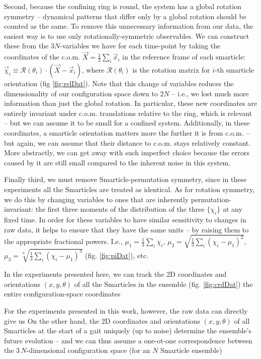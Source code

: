 \documentclass[reprint,prx]{revtex4-1}
\renewcommand{\=}[1]{\stackrel{#1}{=}} %
\renewcommand{\(}{\left (}
\renewcommand{\)}{\right  )}
\renewcommand{\[}{\left [}
\renewcommand{\]}{\right ]}
\newcommand{\<}{\left <}
\renewcommand{\>}{\right >}
\theoremstyle{definition}
\theoremstyle{remark}
\begin{document}
Second, because the confining ring is round, the system has a global rotation symmetry -- dynamical patterns that differ only by a global rotation should be counted as the same. To remove this unnecessary information from our data, the easiest way is to use only rotationally-symmetric observables. We can construct these from the $ 3N $-variables we have for each time-point by taking the coordinates of the c.o.m. $ \vec{X}= \frac{1}{3} \sum_i \vec{x}_i $ in the reference frame of each smarticle: $ \vec{\chi}_i \equiv \mathcal{R}(\theta_i) \cdot (\vec{X} - \vec{x}_i) $, where $ \mathcal{R}(\theta_i) $ is the rotation matrix for $ i $-th smarticle orientation (fig \ref{fig:relDat}). Note that this change of variables reduces the dimensionality of our configuration space down to $ 2N $ -- i.e., we lost much more information than just the global rotation. In particular, these new coordinates are entirely invariant under c.o.m. translations relative to the ring, which is relevant -- but we can assume it to be small for a confined system. Additionally, in these coordinates, a smarticle orientation matters more the further it is from c.o.m. -- but again, we can assume that their distance to c.o.m. stays relatively constant. More abstractly, we can get away with such imperfect choice because the errors caused by it are still small compared to the inherent noise in this system. 

Finally third, we must remove Smarticle-permutation symmetry, since in these experiments all the Smarticles are treated as identical. As for rotation symmetry, we do this by changing variables to ones that are inherently permutation-invariant: the first three moments of the distribution of the three $ \{\chi_i\} $ at any fixed time. In order for these variables to have similar sensitivity to changes in raw data, it helps to ensure that they have the same units -- by raising them to the appropriate fractional powers. I.e., $ \mu_1 = \frac{1}{3} \sum_i \chi_i $, $ \mu_2 = \sqrt{\frac{1}{3} \sum_i (\chi_i-\mu_1)^2} $, $ \mu_3 = \sqrt[3]{\frac{1}{3} \sum_i (\chi_i-\mu_1)^3} $ (fig. \ref{fig:piDat}), etc.

In the experiments presented here, we can track the 2D coordinates and orientations $ (x,y,\theta) $ of all the Smarticles in the ensemble (fig. \ref{fig:crdDat}) the entire configuration-space coordinates 

For the experiments presented in this work, however, the raw data can directly give us On the other hand, the 2D coordinates and orientations $ (x,y,\theta) $ of all Smarticles at the start of a gait uniquely (up to noise) determine the ensemble's future evolution -- and we can thus assume a one-ot-one correspondence between the $ 3\,N $-dimensional configuration space (for an $ N $ Smarticle ensemble)
\end{document}
